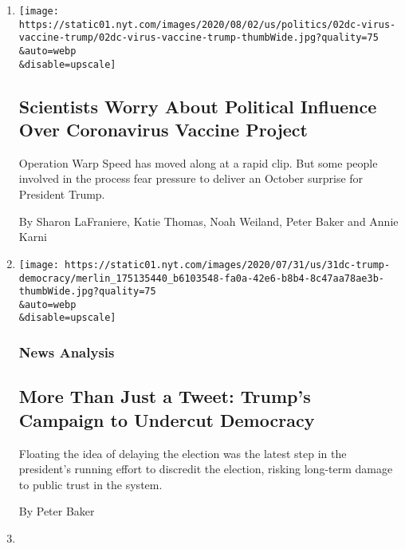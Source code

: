 \begin{enumerate}
\def\labelenumi{\arabic{enumi}.}
\item
  \href{/2020/08/02/us/politics/coronavirus-vaccine.html}{}

  \texttt{[image: https://static01.nyt.com/images/2020/08/02/us/politics/02dc-virus-vaccine-trump/02dc-virus-vaccine-trump-thumbWide.jpg?quality=75\\\&auto=webp\\\&disable=upscale]}

  \hypertarget{scientists-worry-about-political-influence-over-coronavirus-vaccine-project}{%
  \subsection{Scientists Worry About Political Influence Over
  Coronavirus Vaccine
  Project}\label{scientists-worry-about-political-influence-over-coronavirus-vaccine-project}}

  Operation Warp Speed has moved along at a rapid clip. But some people
  involved in the process fear pressure to deliver an October surprise
  for President Trump.

  By Sharon LaFraniere, Katie Thomas, Noah Weiland, Peter Baker and
  Annie Karni
\item
  \href{/2020/07/31/us/politics/trump-tweet-democracy.html}{}

  \texttt{[image: https://static01.nyt.com/images/2020/07/31/us/31dc-trump-democracy/merlin\_175135440\_b6103548-fa0a-42e6-b8b4-8c47aa78ae3b-thumbWide.jpg?quality=75\\\&auto=webp\\\&disable=upscale]}

  \hypertarget{news-analysis}{%
  \subsubsection{News Analysis}\label{news-analysis}}

  \hypertarget{more-than-just-a-tweet-trumps-campaign-to-undercut-democracy}{%
  \subsection{More Than Just a Tweet: Trump's Campaign to Undercut
  Democracy}\label{more-than-just-a-tweet-trumps-campaign-to-undercut-democracy}}

  Floating the idea of delaying the election was the latest step in the
  president's running effort to discredit the election, risking
  long-term damage to public trust in the system.

  By Peter Baker
\item
  \href{/2020/07/30/us/politics/trump-wallace.html}{}


\end{enumerate}

